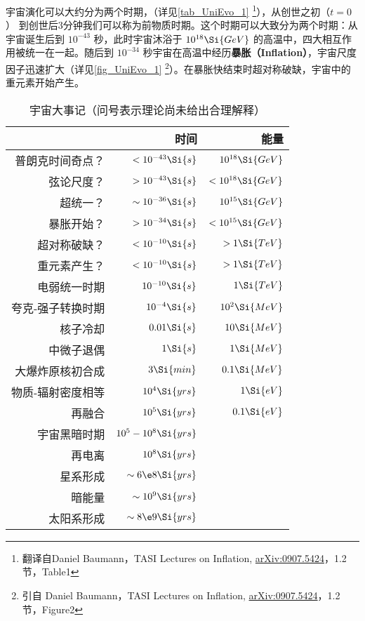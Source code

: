 
\begin{issues}
\issueNeedCite
\issueMissDepend
\end{issues}

宇宙演化可以大约分为两个时期，（详见\autoref{tab_UniEvo_1} \footnote{翻译自Daniel Baumann，TASI Lectures on Inflation, \href{https://arxiv.org/abs/0907.5424}{arXiv:0907.5424}，1.2 节，Table1}），从创世之初（$t=0$） 到创世后3分钟我们可以称为前物质时期。这个时期可以大致分为两个时期：从宇宙诞生后到 $10^{-43}$ 秒，此时宇宙沐浴于 $10^{18}\Si{GeV}$ 的高温中，四大相互作用被统一在一起。随后到 $10^{-34}$ 秒宇宙在高温中经历\textbf{暴胀（Inflation）}，宇宙尺度因子迅速扩大（详见\autoref{fig_UniEvo_1} \footnote{引自 Daniel Baumann，TASI Lectures on Inflation, \href{https://arxiv.org/abs/0907.5424}{arXiv:0907.5424}，1.2 节，Figure2}）。在暴胀快结束时超对称破缺，宇宙中的重元素开始产生。

\begin{table}[ht]
\centering
\caption{宇宙大事记（问号表示理论尚未给出合理解释）}\label{tab_UniEvo_1}
\begin{tabular}{|r|r|r|}
\hline
 & 时间 & 能量 \\
\hline
普朗克时间奇点？ & $<10^{-43}\Si{s}$ & $10^{18}\Si{GeV}$ \\
\hline
弦论尺度？       & $>10^{-43}\Si{s}$ & $<10^{18}\Si{GeV}$ \\
\hline
超统一？         & $\sim 10^{-36}\Si{s}$ & $10^{15}\Si{GeV}$ \\
\hline
暴胀开始？       & $>10^{-34}\Si{s}$ & $<10^{15} \Si{GeV}$ \\
\hline
超对称破缺？     & $<10^{-10}\Si{s}$ & $>1 \Si{TeV}$ \\
\hline
重元素产生？     & $<10^{-10}\Si{s}$ & $>1 \Si{TeV}$ \\
\hline
电弱统一时期    & $10^{-10}\Si{s}$ & $1 \Si{TeV}$ \\
\hline
夸克-强子转换时期 & $10^{-4}\Si{s}$ & $10^2 \Si{MeV}$ \\
\hline
核子冷却        & $0.01\Si{s}$ & $10 \Si{MeV}$ \\
\hline
中微子退偶      & $1 \Si{s}$  & $1 \Si{MeV}$ \\
\hline
大爆炸原核初合成  & $3 \Si{min}$ & $0.1 \Si{MeV}$ \\
\hline
物质-辐射密度相等 & $10^4\Si{yrs}$  & $1 \Si{eV}$ \\
\hline
再融合 & $10^5\Si{yrs}$  & $0.1 \Si{eV}$ \\
\hline
宇宙黑暗时期 & $10^5 - 10^8\Si{yrs}$  &  \\
\hline
再电离 & $10^8\Si{yrs}$  &  \\
\hline
星系形成 & $\sim 6\e8\Si{yrs}$  &  \\
\hline
暗能量 & $\sim 10^9\Si{yrs}$  &  \\
\hline
太阳系形成 & $ \sim 8\e9\Si{yrs}$  &  \\
\hline
\end{tabular}
\end{table}

